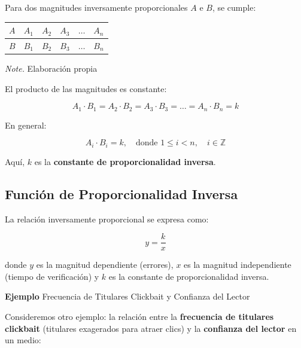 \documentclass[
  stu,
  floatsintext,
  longtable,
  a4paper,
  nolmodern,
  notxfonts,
  notimes,
  colorlinks=true,linkcolor=blue,citecolor=blue,urlcolor=blue]{apa7}
\begin{document}
Para dos magnitudes inversamente proporcionales \(A\) e \(B\), se
cumple:

\begin{table}

{\caption{{Magnitudes inversamente
proporcionales}{\label{tbl-mytable11}}}}

\begin{longtable}[]{@{}llllll@{}}
\toprule\noalign{}
\(A\) & \(A_1\) & \(A_2\) & \(A_3\) & \(\dots\) & \(A_n\) \\
\midrule\noalign{}
\endhead
\bottomrule\noalign{}
\endlastfoot
\(B\) & \(B_1\) & \(B_2\) & \(B_3\) & \(\dots\) & \(B_n\) \\
\end{longtable}

{\noindent \emph{Note.} Elaboración propia}

\end{table}

El producto de las magnitudes es constante:

\[
A_1 \cdot B_1 = A_2 \cdot B_2 = A_3 \cdot B_3 = \dots = A_n \cdot B_n = k
\]

En general:

\[
A_i \cdot B_i = k, \quad \text{donde } 1 \leq i < n, \quad i \in \mathbb{Z}
\]

Aquí, \(k\) es la \textbf{constante de proporcionalidad inversa}.

\subsection{Función de Proporcionalidad
Inversa}\label{funciuxf3n-de-proporcionalidad-inversa}

La relación inversamente proporcional se expresa como:

\[
y = \frac{k}{x}
\]

donde \(y\) es la magnitud dependiente (errores), \(x\) es la magnitud
independiente (tiempo de verificación) y \(k\) es la constante de
proporcionalidad inversa.

\textbf{Ejemplo} Frecuencia de Titulares Clickbait y Confianza del
Lector

Consideremos otro ejemplo: la relación entre la \textbf{frecuencia de
titulares clickbait} (titulares exagerados para atraer clics) y la
\textbf{confianza del lector} en un medio:
\end{document}
